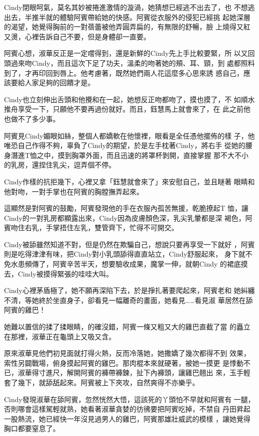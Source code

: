 Cindy閉眼呵氣，莫名其妙被捲進激情的漩渦，她猜想已經逃不出去了，也
不想逃出去，半推半就的體驗阿賓帶給她的快感。阿賓從衣服外的侵犯已經挑
起她深層的渴望，她覺得胸前的一對蓓蕾被他弄圓弄扁的，有無限的舒暢，臉
上燒得又紅又燙，心裡告訴自己不要，但是身體卻一直要。

阿賓心想，淑華反正是一定嚐得到，還是新鮮的Cindy先上手比較要緊，所
以又回頭過來吻Cindy，而且這次下足了功夫，溫柔的吻著她的頰、耳、頸，到
處都照料到了，才再印回到唇上。他考慮著，既然她們兩人花這麼多心思來誘
惑自己，應該要給人家足夠的回饋才是。

Cindy也立刻伸出舌頭和他攪和在一起，她想反正吻都吻了，摸也摸了，不
如順水推舟享受一下，只願他不要再過份就好。而且，鈺慧馬上就會來了，在
此之前他也做不了多少事。

阿賓見Cindy媚眼如絲，整個人都嬌軟在他懷裡，眼看是全任憑他擺佈的樣
子，他唯恐自己作得不夠，辜負了Cindy的期望，於是左手枕著Cindy，將右手
從她的腰身潛進T恤之中，摸到胸罩外面，而且迅速的將罩杯剝開，直接掌握
那不大不小的乳房，還捏住乳尖，逗弄個不停。

Cindy作樣的抗拒幾下，心裡又拿「鈺慧就會來了」來安慰自己，並且瞇著
眼睛和他對吻，一對手掌也在阿賓的胸膛撫弄起來。

這顯然是對阿賓的鼓勵，阿賓發現他的手在衣服內孤苦無援，乾脆撩起T
恤，讓Cindy的一對乳房都顯露出來，Cindy因為皮膚顏色深，乳尖乳暈都是深
褐色，阿賓吻住右乳，手掌捂住左乳，雙管齊下，忙得不可開交。

Cindy被舔雖然知道不對，但是仍然在欺騙自己，想說只要再享受一下就好
，阿賓則是吃得津津有味，把Cindy對小乳頭舔得直直站立，Cindy舒服起來，
身下就不免水患頻傳了，阿賓辛苦半天，想要驗收成果，魔掌一伸，就朝Cindy
的裙底摸去，Cindy被摸得緊張的哇哇大叫。

Cindy心裡茅盾極了，她不願再深陷下去，於是掙扎著要爬起來，阿賓老和
她糾纏不清，等她終於坐直身子，卻看見一幅離奇的畫面，她看見……看見淑
華居然在舔阿賓的雞巴！

她難以置信的揉了揉眼睛，的確沒錯，阿賓一條又粗又大的雞巴直截了當
的矗立在那裡，淑華正在龜頭上又吸又含。

原來淑華見他們初見面就打得火熱，反而冷落她，她撒嬌了幾次都得不到
效果，索性另闢戰場，俯身摸起阿賓的雞巴。那肉棍本來就硬著，被她一摸更
是悸動不已，淑華得寸進尺，解開阿賓的褲帶褲鍊，扯下內褲頭，讓雞巴翹出
來，玉手輕套了幾下，就舔舐起來。阿賓被上下夾攻，自然爽得不亦樂乎。

Cindy發現淑華在舔阿賓，忽然恍然大悟，這該死的丫頭怕不早就和阿賓有
一腿，否則哪會這樣駕輕就熟，她看著淑華貪婪的彷彿要把阿賓吃掉，不禁自
丹田昇起一股熱流，她已經快一年沒見過男人的雞巴，阿賓那雄壯威武的模樣
，讓她覺得胸口都要窒息了。

